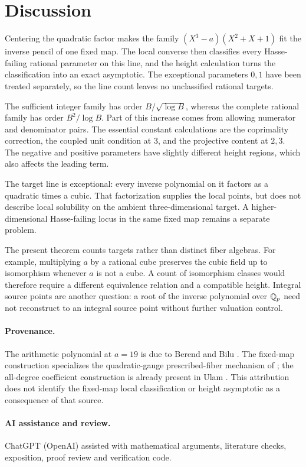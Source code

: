 \section{Discussion}

Centering the quadratic factor makes the family
\((X^3-a)(X^2+X+1)\) fit the inverse pencil of one fixed map. The local
converse then classifies every Hasse-failing rational parameter on this
line, and the height calculation turns the classification into an exact
asymptotic. The exceptional parameters \(0,1\) have been treated
separately, so the line count leaves no unclassified rational targets.

The sufficient integer family has order \(B/\sqrt{\log B}\), whereas
the complete rational family has order \(B^2/\log B\). Part of this
increase comes from allowing numerator and denominator pairs. The
essential constant calculations are the coprimality correction, the
coupled unit condition at \(3\), and the projective content at \(2,3\).
The negative and positive parameters have slightly different height
regions, which also affects the leading term.

The target line is exceptional: every inverse polynomial on it factors
as a quadratic times a cubic. That factorization supplies the local
points, but does not describe local solubility on the ambient
three-dimensional target. A higher-dimensional Hasse-failing locus in
the same fixed map remains a separate problem.

The present theorem counts targets rather than distinct fiber algebras.
For example, multiplying \(a\) by a rational cube preserves the cubic
field up to isomorphism whenever \(a\) is not a cube. A count of
isomorphism classes would therefore require a different equivalence
relation and a compatible height. Integral source points are another
question: a root of the inverse polynomial over \(\mathbb Q_p\) need not
reconstruct to an integral source point without further valuation control.

\paragraph{Provenance.}
The arithmetic polynomial at \(a=19\) is due to Berend and Bilu
\cite{BerendBilu}. The fixed-map construction specializes the quadratic-gauge
prescribed-fiber mechanism of \cite{vanRijnFibers}; the all-degree
coefficient construction is already present in Ulam
\cite[Theorem~5.2]{Ulam}. This attribution does not identify the fixed-map
local classification or height asymptotic as a consequence of that source.

\paragraph{AI assistance and review.}
ChatGPT (OpenAI) assisted with mathematical arguments, literature checks,
exposition, proof review and verification code.
